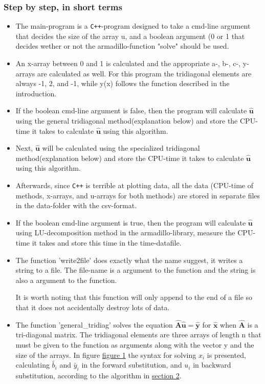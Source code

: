 \documentclass[11pt,a4paper,notitlepage]{article}
\begin{document}
\subsubsection{Step by step, in short terms}
\begin{itemize}
\item The main-program is a \verb|C++|-program designed to take a cmd-line argument that decides the size of the array u, and a boolean argument (0 or 1 that decides wether or not the armadillo-function "solve" should be used.
	
\item An x-array between 0 and 1 is calculated and the appropriate a-, b-, c-, y-arrays are calculated as well. For this program the tridiagonal elements are always -1, 2, and -1, while y(x) follows the function described in the introduction.

\item If the boolean cmd-line argument is false, then the program will calculate $\mathbf{\hat{u}}$ using the general tridiagonal method(explanation below) and store the CPU-time it takes to calculate $\mathbf{\hat{u}}$ using this algorithm.

\item Next, $\mathbf{\hat{u}}$ will be calculated using the specialized tridiagonal method(explanation below) and store the CPU-time it takes to calculate $\mathbf{\hat{u}}$ using this algorithm.

\item Afterwards, since \verb|C++| is terrible at plotting data, all the data (CPU-time of methods, x-arrays, and u-arrays for both methods) are stored in separate files in the data-folder with the csv-format.

\item If the boolean cmd-line argument is true, then the program will calculate $\mathbf{\hat{u}}$ using LU-decomposition method in the armadillo-library, measure the CPU-time it takes and store this time in the time-datafile.
	
\item The function 'write2file' does exactly what the name suggest, it writes a string to a file. The file-name is a argument to the function and the string is also a argument to the function. 

It is worth noting that this function will only append to the end of a file so that it does not accidentally destroy lots of data.

\item The function 'general\_tridiag' solves the equation $\mathbf{\hat{A}}\mathbf{\hat{u}} = \mathbf{\hat{y}}$ for $\mathbf{\hat{x}}$ when $\mathbf{\hat{A}}$ is a tri-diagonal matrix. The tridiagonal elements are three arrays of length n that must be given to the function as arguments along with the vector y and the size of the arrays. In figure \hyperref[code:general_syntax]{figure 1} the syntax for solving $x_i$ is presented, calculating $\tilde{b_i}$ and $\tilde{y_i}$ in the forward substitution, and $u_i$ in backward substitution, according to the algorithm in \hyperref[section:method]{section 2}.


\end{itemize}
\end{document}
